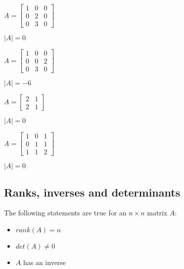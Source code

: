 \documentclass[12pt,a4paper]{article}
\theoremstyle{regla}
\theoremstyle{remark}
\theoremstyle{definition}
\theoremstyle{nonumberbreak}
\begin{document}
\begin{xmpl}


$A=
\begin{bmatrix}
1 & 0 & 0  \\
0 & 2 & 0  \\
0 & 3 & 0 
\end{bmatrix}$

$\vert A \vert = 0$


\end{xmpl}
\begin{xmpl}

$A=
\begin{bmatrix}
1 & 0 & 0  \\
0 & 0 & 2  \\
0 & 3 & 0 
\end{bmatrix}$

$\vert A \vert = -6$
\end{xmpl}
\begin{xmpl}


$A=
\begin{bmatrix}
2 & 1  \\
2 & 1 
\end{bmatrix}$

$\vert A \vert = 0$
\end{xmpl}
\begin{xmpl}


$A=
\begin{bmatrix}
1 & 0 & 1  \\
0 & 1 & 1  \\
1 & 1 & 2 
\end{bmatrix}$

$\vert A \vert = 0$
\end{xmpl}

\subsection{Ranks, inverses and determinants}
\begin{fbox}
\begin{minipage}{0.97\textwidth}
The following statements are true for an $n\times n$ matrix $A$:
\begin{itemize}
\item $rank (A)= n$
\item $det(A)\neq 0$
\item $A$ has an inverse
\end{itemize}
\end{minipage}
\end{fbox}
\end{document}
